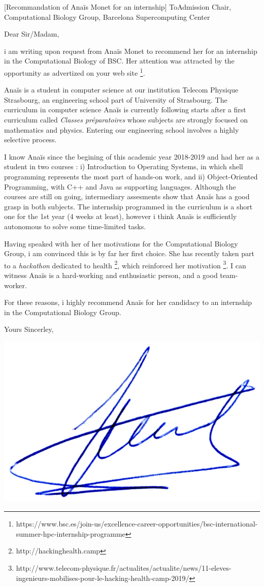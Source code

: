 \documentclass[a4paper,10pt]{article}
\begin{document}


\begin{letter}[Recommandation of Anaïs Monet for an internship]
  {To}{Admission Chair, Computational Biology Group, Barcelona Supercomputing Center}

  Dear Sir/Madam,

  i am writing upon request from Anaïs  Monet to recommend her for an internship
  in  the Computational  Biology  of BSC.  Her attention  was  attracted by  the
  opportunity as advertized on your web site%
  \footnote{https://www.bsc.es/join-us/excellence-career-opportunities/bsc-international-summer-hpc-internship-programme
  }.

  Anaïs is  a student in  computer science  at our institution  Telecom Physique
  Strasbourg,  an  engineering school  part  of  University of  Strasbourg.  The
  curriculum in  computer science  Anaïs is currently  following starts  after a
  first  curriculum  called  \emph{Classes  préparatoires}  whose  subjects  are
  strongly focused on mathematics and physics. Entering our engineering school
  involves a highly selective process.


  I know Anaïs since the begining of this academic year 2018-2019 and had her as
  a student  in two  courses :  i) Introduction to  Operating Systems,  in which
  shell  programming  represents  the  most  part  of  hands-on  work,  and  ii)
  Object-Oriented  Programming,  with  C++  and Java  as  supporting  languages.
  Although the  courses are  still on going,  intermediary assesments  show that
  Anaïs has a good grasp  in both subjects.
%
  The internship programmed in the curriculum is a short one for the 1st year
  (4 weeks at least), however i think Anaïs is sufficiently autonomous to solve
  some time-limited tasks. 

  Having  speaked with  her of  her  motivations for  the Computational  Biology
  Group, i am convinced this is by  far her first choice. She has recently taken
  part      to       a      \emph{hackathon}      dedicated       to      health
  \footnote{http://hackinghealth.camp}, which reinforced her motivation%
  \footnote{http://www.telecom-physique.fr/actualites/actualite/news/11-eleves-ingenieurs-mobilises-pour-le-hacking-health-camp-2019/}. I
  can  witness Anaïs  is  a hard-working  and enthusiastic  person,  and a  good
  team-worker.

 For these reasons, i highly recommend Anaïs for her candidacy to an internship 
 in the Computational Biology Group.

 Yours Sincerley,


\end{letter}
\begin{flushright}
\includegraphics[width=.18\textwidth]{signgenaud.jpg}
\end{flushright}
\end{document}
